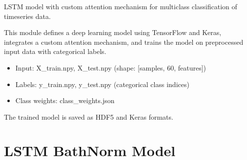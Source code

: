 \documentclass[letterpaper,10pt,english]{sphinxmanual}
\begin{document}
\begin{fulllineitems}
\label{\detokenize{lstm_attention_model:lstm_attention_model.train_attention_model}}
\pysigstartsignatures
{}
\pysigstopsignatures
\sphinxAtStartPar
LSTM model with custom attention mechanism for multi\sphinxhyphen{}class classification
of time\sphinxhyphen{}series data.

\sphinxAtStartPar
This module defines a deep learning model using TensorFlow and Keras,
integrates a custom attention mechanism, and trains the model
on preprocessed input data with categorical labels.
\begin{description}
\begin{itemize}
\item {} 
\sphinxAtStartPar
Input: X\_train.npy, X\_test.npy (shape: {[}samples, 60, features{]})

\item {} 
\sphinxAtStartPar
Labels: y\_train.npy, y\_test.npy (categorical class indices)

\item {} 
\sphinxAtStartPar
Class weights: class\_weights.json

\end{itemize}

\end{description}

\sphinxAtStartPar
The trained model is saved as HDF5 and Keras formats.

\end{fulllineitems}


\sphinxstepscope


\chapter{LSTM BathNorm Model}
\label{\detokenize{lstm_bathnorm_model:module-lstm_bathnorm_model}}\label{\detokenize{lstm_bathnorm_model:lstm-bathnorm-model}}\label{\detokenize{lstm_bathnorm_model::doc}}
\end{document}
